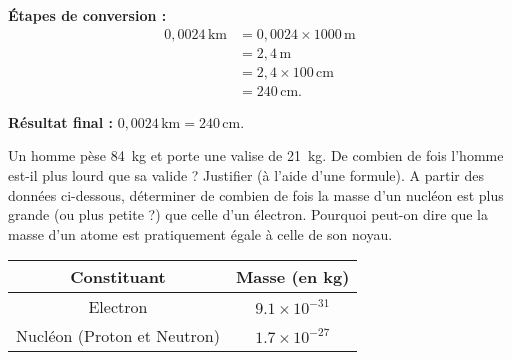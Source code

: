 \documentclass[answers]{exam}
\begin{document}
\begin{questions}
\begin{solution}
    \textbf{Étapes de conversion :}
    \begin{align*}
      0,0024 \, \mathrm{km} &= 0,0024 \times 1000 \, \mathrm{m} \\
      &= 2,4 \, \mathrm{m} \\
      &= 2,4 \times 100 \, \mathrm{cm} \\
      &= 240 \, \mathrm{cm}.
    \end{align*}

    \textbf{Résultat final :} \( 0,0024 \, \mathrm{km} = 240 \, \mathrm{cm} \).
  \end{solution}
  \question[2.5] Un homme pèse \SI{84}{kg} et porte une valise de \SI{21}{kg}. De combien de fois l'homme est-il plus lourd que sa valide ? Justifier (à l'aide d'une formule). A partir des données ci-dessous, déterminer de combien de fois la masse d'un nucléon est plus grande (ou plus petite ?) que celle d'un électron. Pourquoi peut-on dire que la masse d'un atome est pratiquement égale à celle de son noyau.

  \begin{center}
    \begin{tabular}{SS}
      \toprule
      {Constituant} & {Masse (en \si{kg})} \\
      \midrule
      {Electron} & {\(9.1 \times 10^{-31}\)} \\
      {Nucléon (Proton et Neutron)} & {\(1.7 \times 10^{-27}\)} \\
      \bottomrule
    \end{tabular}
  \end{center}
\end{questions}
\end{document}
